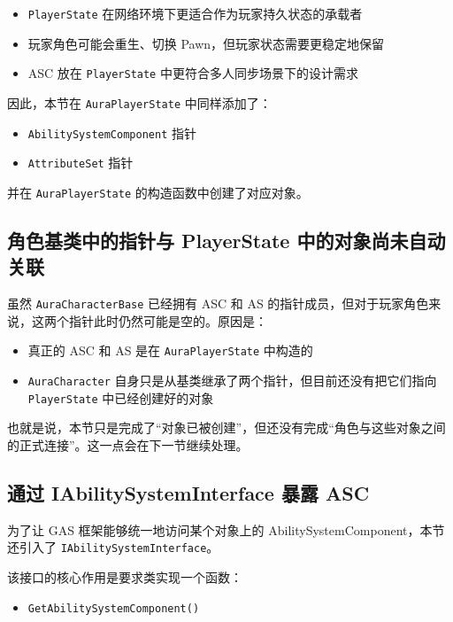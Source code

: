 \begin{itemize}
	\item \texttt{PlayerState} 在网络环境下更适合作为玩家持久状态的承载者
	\item 玩家角色可能会重生、切换 Pawn，但玩家状态需要更稳定地保留
	\item ASC 放在 \texttt{PlayerState} 中更符合多人同步场景下的设计需求
\end{itemize}

因此，本节在 \texttt{AuraPlayerState} 中同样添加了：

\begin{itemize}
	\item \texttt{AbilitySystemComponent} 指针
	\item \texttt{AttributeSet} 指针
\end{itemize}

并在 \texttt{AuraPlayerState} 的构造函数中创建了对应对象。

\subsection{角色基类中的指针与 PlayerState 中的对象尚未自动关联}

虽然 \texttt{AuraCharacterBase} 已经拥有 ASC 和 AS 的指针成员，但对于玩家角色来说，这两个指针此时仍然可能是空的。原因是：

\begin{itemize}
	\item 真正的 ASC 和 AS 是在 \texttt{AuraPlayerState} 中构造的
	\item \texttt{AuraCharacter} 自身只是从基类继承了两个指针，但目前还没有把它们指向 \texttt{PlayerState} 中已经创建好的对象
\end{itemize}

也就是说，本节只是完成了“对象已被创建”，但还没有完成“角色与这些对象之间的正式连接”。这一点会在下一节继续处理。

\subsection{通过 IAbilitySystemInterface 暴露 ASC}

为了让 GAS 框架能够统一地访问某个对象上的 AbilitySystemComponent，本节还引入了 \texttt{IAbilitySystemInterface}。

该接口的核心作用是要求类实现一个函数：

\begin{itemize}
	\item \texttt{GetAbilitySystemComponent()}
\end{itemize}

